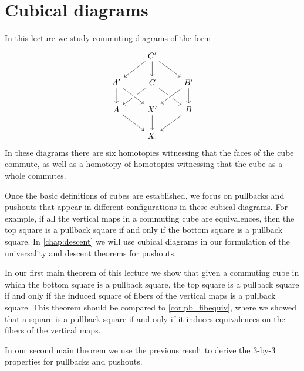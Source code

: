 \chapter{Cubical diagrams}

In this lecture we study commuting diagrams of the form
\begin{equation*}
  \begin{tikzcd}
    & C' \arrow[dl] \arrow[d] \arrow[dr] \\
    A' \arrow[d] & C \arrow[dl] \arrow[dr] & B' \arrow[dl,crossing over] \arrow[d] \\
    A \arrow[dr] & X' \arrow[from=ul,crossing over] \arrow[d] & B \arrow[dl] \\
    & X.
  \end{tikzcd}
\end{equation*}
In these diagrams there are six homotopies witnessing that the faces of the cube commute, as well as a homotopy of homotopies witnessing that the cube as a whole commutes.

Once the basic definitions of cubes are established, we focus on pullbacks and pushouts that appear in different configurations in these cubical diagrams. For example, if all the vertical maps in a commuting cube are equivalences, then the top square is a pullback square if and only if the bottom square is a pullback square. In \cref{chap:descent} we will use cubical diagrams in our formulation of the universality and descent theorems for pushouts.

In our first main theorem of this lecture we show that given a commuting cube in which the bottom square is a pullback square, the top square is a pullback square if and only if the induced square of fibers of the vertical maps is a pullback square. This theorem should be compared to \cref{cor:pb_fibequiv}, where we showed that a square is a pullback square if and only if it induces equivalences on the fibers of the vertical maps.

In our second main theorem we use the previous result to derive the 3-by-3 properties for pullbacks and pushouts.

